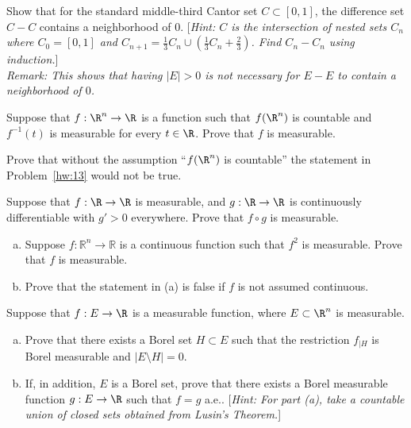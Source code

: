 \begin{hw} \label{hw:12}
Show that for the standard middle-third Cantor set $C \subset [0, 1]$, the difference set $C-C$ contains a neighborhood of $0$. [\emph{Hint: $C$ is the intersection of nested sets $C_n$ where $C_0=[0, 1]$  and $C_{n+1}= \frac13C_n \cup (\frac13 C_n+\frac23)$. Find $C_n-C_n$ using induction.}] \\

\noindent\emph{Remark: This shows that having $|E|>0$ is not necessary for $E-E$ to contain a neighborhood of $0$.} \\
\end{hw}


\begin{hw} \label{hw:13}
Suppose that $f: \R^n \to \R$ is a function such that $f(\R^n)$ is countable and $f^{-1}(t)$ is measurable for every $t \in \R$. Prove that $f$ is measurable. \\
\end{hw}


\begin{hw} \label{hw:14}
Prove that without the assumption ``$f(\R^n)$ is countable'' the statement in Problem~\ref{hw:13} would not be true. \\
\end{hw}


\begin{hw} \label{hw:15}
Suppose that $f: \R \to \R$ is measurable, and $g: \R \to \R$ is continuously differentiable with $g'>0$ everywhere. Prove that $f \circ g$ is measurable. \\
\end{hw}


\begin{hw} \label{hw:16} \hfill
\begin{enumerate}[(a)]
\item Suppose $f\colon \mathbb R^n\to\mathbb R$ is a continuous function such that $f^2$ is measurable. Prove that $f$ is measurable.
\item Prove that the statement in (a) is false if $f$ is not assumed continuous. \\
\end{enumerate}
\end{hw}


\begin{hw} \label{hw:17}
Suppose that $f: E \to \R$ is a measurable function, where $E \subset \R^n$ is measurable. 
\begin{enumerate}[(a)]
\item Prove that there exists a Borel set $H \subset E$ such that the restriction $f_{|H}$ is Borel measurable and $|E \setminus H|=0$. 
\item If, in addition, $E$ is a Borel set, prove that there exists a Borel measurable function $g: E \to \R$ such that $f=g$ a.e.. [\emph{Hint: For part (a), take a countable union of closed sets obtained from Lusin's Theorem.}] \\
\end{enumerate}
\end{hw}


